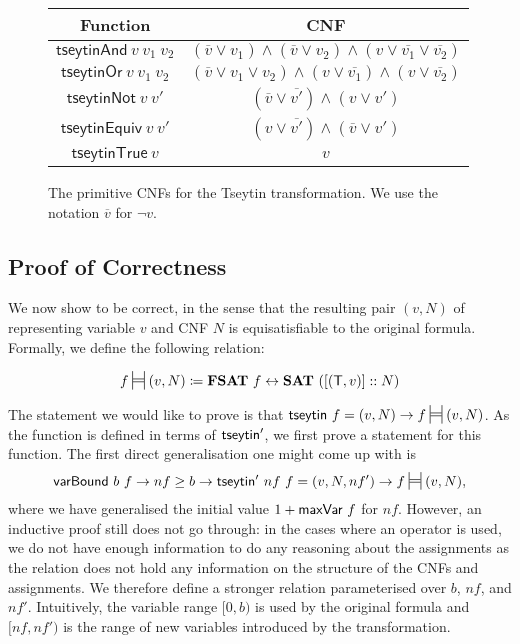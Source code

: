 \begin{figure}
  \begin{center}
    \begin{tabular}{c|c} 
      Function & CNF \\
      \midrule{}
      $\textsf{tseytinAnd}~v~v_1~v_2$ & $(\overline{v} \lor v_1) \land (\overline{v} \lor v_2) \land (v \lor \overline{v_1} \lor \overline{v_2})$ \\
      $\textsf{tseytinOr}~v~v_1~v_2$ & $(\overline{v} \lor v_1 \lor v_2) \land (v \lor \overline{v_1}) \land (v \lor \overline{v_2})$ \\
      $\textsf{tseytinNot}~v~v'$ & $(\overline{v} \lor \overline{v'}) \land (v \lor v')$ \\
      $\textsf{tseytinEquiv}~v~v'$ & $(v \lor \overline{v'}) \land (\overline{v} \lor v')$ \\
      $\textsf{tseytinTrue}~v$ & $v$ 
    \end{tabular}
  \end{center}
  \caption{The primitive CNFs for the Tseytin transformation. We use the notation $\overline{v}$ for $\lnot v$.}\label{fig:prim_cnfs}
\end{figure}

\subsection{Proof of Correctness}
We now show \tseytin{} to be correct, in the sense that the resulting pair $(v, N)$ of representing variable $v$ and CNF $N$ is equisatisfiable to the original formula. Formally, we define the following relation:
\newcommand{\frepr}{\sdststile{}{}}
\begin{definition}
  \[ f \frepr{} (v, N) \defeq \fsat{}~f \leftrightarrow \SAT{}~([(\btrue, v)] :: N)\]
\end{definition}

The statement we would like to prove is that $\tseytin~f = (v, N) \rightarrow f \frepr{} (v, N)$. As the function is defined in terms of $\textsf{tseytin}'$, we first prove a statement for this function. The first direct generalisation one might come up with is
\[\varBound~b~f \rightarrow nf \ge b \rightarrow \tseytin'~nf~f = (v, N, nf') \rightarrow f \frepr{} (v, N), \]
where we have generalised the initial value $1 +{\textsf{maxVar}~f}$ for $nf$.
However, an inductive proof still does not go through: in the cases where an operator is used, we do not have enough information to do any reasoning about the assignments as the relation does not hold any information on the structure of the CNFs and assignments. 
We therefore define a stronger relation parameterised over $b$, $nf$, and $nf'$. Intuitively, the variable range $[0, b)$ is used by the original formula and $[nf, nf')$ is the range of new variables introduced by the transformation.

